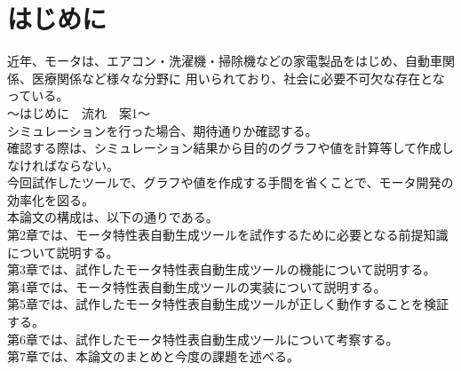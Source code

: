 \chapter{はじめに}\label{cha:Introduction}
近年、モータは、エアコン・洗濯機・掃除機などの家電製品をはじめ、自動車関係、医療関係など様々な分野に
用いられており\cite{モータ使用製品}、社会に必要不可欠な存在となっている。\\

～はじめに　流れ　案1～\\
シミュレーションを行った場合、期待通りか確認する。\\
確認する際は、シミュレーション結果から目的のグラフや値を計算等して作成しなければならない。\\
今回試作したツールで、グラフや値を作成する手間を省くことで、モータ開発の効率化を図る。\\



本論文の構成は、以下の通りである。\\
第2章では、モータ特性表自動生成ツールを試作するために必要となる前提知識について説明する。\\
第3章では、試作したモータ特性表自動生成ツールの機能について説明する。\\
第4章では、モータ特性表自動生成ツールの実装について説明する。\\
第5章では、試作したモータ特性表自動生成ツールが正しく動作することを検証する。\\
第6章では、試作したモータ特性表自動生成ツールについて考察する。\\
第7章では、本論文のまとめと今度の課題を述べる。\\
